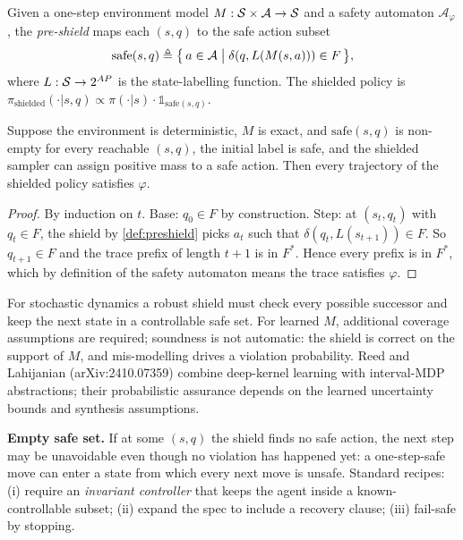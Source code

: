 \documentclass[11pt,oneside]{scrbook}
\begin{document}
\begin{definition}\label{def:preshield}
Given a one-step environment model $M: \mathcal{S} \times \mathcal{A} \to \mathcal{S}$
and a safety automaton $\mathcal{A}_\varphi$, the \emph{pre-shield} maps each
$(s, q)$ to the safe action subset
\[
   \mathrm{safe}(s, q) \triangleq \bigl\{\, a \in \mathcal{A} \;\big|\; \delta(q, L(M(s,a))) \in F \,\bigr\},
\]
where $L: \mathcal{S} \to 2^{AP}$ is the state-labelling function. The shielded
policy is $\pi_{\text{shielded}}(\cdot | s, q) \propto \pi(\cdot | s) \cdot \mathbb{1}_{\mathrm{safe}(s, q)}$.
\end{definition}

\begin{theorem}\label{thm:shield-sound}
Suppose the environment is deterministic, $M$ is exact, and $\mathrm{safe}(s, q)$
is non-empty for every reachable $(s, q)$, the initial label is safe,
and the shielded sampler can assign positive mass to a safe action. Then every trajectory of the
shielded policy satisfies $\varphi$.
\end{theorem}

\begin{proof}
By induction on $t$. Base: $q_0 \in F$ by construction.
Step: at $(s_t, q_t)$ with $q_t \in F$, the shield by \cref{def:preshield}
picks $a_t$ such that $\delta(q_t, L(s_{t+1})) \in F$. So $q_{t+1} \in F$ and
the trace prefix of length $t+1$ is in $F^*$. Hence every prefix is in $F^*$,
which by definition of the safety automaton means the trace satisfies
$\varphi$.
\end{proof}

\begin{remark}
For stochastic dynamics a robust shield must check every possible successor
and keep the next state in a controllable safe set. For learned $M$,
additional coverage assumptions are required; soundness is not automatic: the shield is correct on the support of $M$, and
mis-modelling drives a violation probability. Reed and Lahijanian (arXiv:2410.07359) combine deep-kernel learning with interval-MDP abstractions; their probabilistic assurance depends on the learned uncertainty bounds and synthesis assumptions.
\end{remark}

\begin{pitfall}
\textbf{Empty safe set.} If at some $(s, q)$ the shield finds no safe action,
the next step may be unavoidable even though no violation has happened yet:
a one-step-safe move can enter a state from which every next move is unsafe. Standard recipes: (i) require an \emph{invariant
controller} that keeps the agent inside a known-controllable subset; (ii)
expand the spec to include a recovery clause; (iii) fail-safe by stopping.
\end{pitfall}
\end{document}
